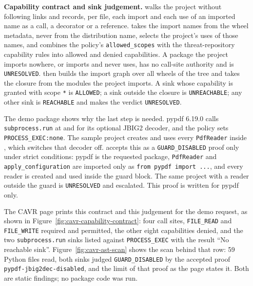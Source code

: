 \begin{sloppypar}
\textbf{Capability contract and sink judgement.}  walks the project without following links and records, per file, each import and each use of an imported name as a call, a decorator or a reference.  takes the import names from the wheel metadata, never from the distribution name, selects the project's uses of those names, and combines the policy's \texttt{allowed\_scopes} with the threat-repository capability rules into allowed and denied capabilities. A package the project imports nowhere, or imports and never uses, has no call-site authority and is \texttt{UNRESOLVED}.  then builds the import graph over all wheels of the tree and takes the closure from the modules the project imports. A sink whose capability is granted with scope \texttt{*} is \texttt{ALLOWED}; a sink outside the closure is \texttt{UNREACHABLE}; any other sink is \texttt{REACHABLE} and makes the verdict \texttt{UNRESOLVED}.
\end{sloppypar}

\begin{sloppypar}
The demo package shows why the last step is needed. pypdf 6.19.0 calls \texttt{subprocess.run} at  and  for its optional JBIG2 decoder, and the policy sets \texttt{PROCESS\_EXEC:none}. The sample project creates and uses every \texttt{PdfReader} inside , which switches that decoder off.  accepts this as a \texttt{GUARD\_DISABLED} proof only under strict conditions: pypdf is the requested package, \texttt{PdfReader} and \texttt{apply\_configuration} are imported only as \texttt{from pypdf import ...}, and every reader is created and used inside the guard block. The same project with a reader outside the guard is \texttt{UNRESOLVED} and escalated. This proof is written for pypdf only.
\end{sloppypar}

\begin{sloppypar}
The CAVR page prints this contract and this judgement for the demo request, as shown in Figure~\ref{fig:cavr-capability-contract}: four call sites, \texttt{FILE\_READ} and \texttt{FILE\_WRITE} required and permitted, the other eight capabilities denied, and the two \texttt{subprocess.run} sinks listed against \texttt{PROCESS\_EXEC} with the result ``No reachable sink''. Figure~\ref{fig:cavr-ast-scan} shows the scan behind that row: 59 Python files read, both sinks judged \texttt{GUARD\_DISABLED} by the accepted proof \texttt{pypdf-jbig2dec-disabled}, and the limit of that proof as the page states it. Both are static findings; no package code was run.
\end{sloppypar}

